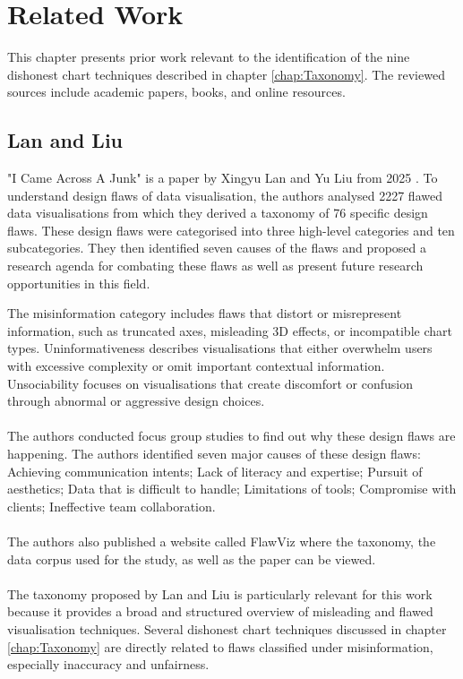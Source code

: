%
%
% 
% 
% 


\chapter{Related Work}
\label{chap:RelatedWork}

This chapter presents prior work relevant to the identification of the nine dishonest chart techniques described in chapter \ref{chap:Taxonomy}. The reviewed sources include academic papers, books, and online resources.

\section{Lan and Liu}
"I Came Across A Junk" is a paper by Xingyu Lan and Yu Liu from 2025 \cite{Liu2025}. To understand design flaws of data visualisation, the authors analysed 2227 flawed data visualisations from which they derived a taxonomy of 76 specific design flaws. These design flaws were categorised into three high-level categories and ten subcategories. They then identified seven causes of the flaws and proposed a research agenda for combating these flaws as well as present future research opportunities in this field.

The misinformation category includes flaws that distort or misrepresent information, such as truncated axes, misleading 3D effects, or incompatible chart types. Uninformativeness describes visualisations that either overwhelm users with excessive complexity or omit important contextual information. Unsociability focuses on visualisations that create discomfort or confusion through abnormal or aggressive design choices.
\\\\
The authors conducted focus group studies to find out why these design flaws are happening. The authors identified seven major causes of these design flaws: Achieving communication intents; Lack of literacy and expertise; Pursuit of aesthetics; Data that is difficult to handle; Limitations of tools; Compromise with clients; Ineffective team collaboration.
\\\\
The authors also published a website called FlawViz where the taxonomy, the data corpus used for the study, as well as the paper can be viewed.
\\\\
The taxonomy proposed by Lan and Liu is particularly relevant for this work because it provides a broad and structured overview of misleading and flawed visualisation techniques. Several dishonest chart techniques discussed in chapter \ref{chap:Taxonomy} are directly related to flaws classified under misinformation, especially inaccuracy and unfairness.


